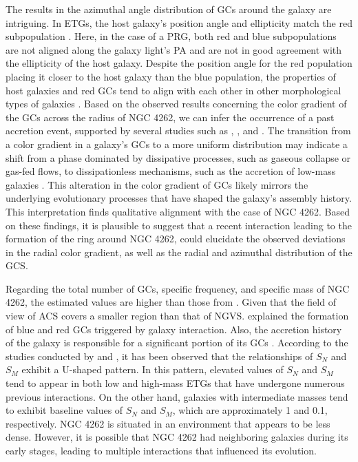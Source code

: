 \documentclass[fleqn,usenatbib]{mnras}
\begin{document}
The results in the azimuthal angle distribution of GCs around the galaxy are intriguing. In ETGs, the host galaxy's position angle and ellipticity match the red subpopulation \citep{2013Wang}. Here, in the case of a PRG, both red and blue subpopulations are not aligned along the galaxy light's PA and are not in good agreement with the ellipticity of the host galaxy. Despite the position angle for the red population placing it closer to the host galaxy than the blue population, the properties of host galaxies and red GCs tend to align with each other in other morphological types of galaxies \citep{2007Rhode,2016Kartha}. Based on the observed results concerning the color gradient of the GCs across the radius of NGC 4262, we can infer the occurrence of a past accretion event, supported by several studies such as \citet{2011forbe}, \citet{2017Caso}, and \citet{2024Caso}. The transition from a color gradient in a galaxy's GCs to a more uniform distribution may indicate a shift from a phase dominated by dissipative processes, such as gaseous collapse or gas-fed flows, to dissipationless mechanisms, such as the accretion of low-mass galaxies \citep{2011forbe,2009Naab,2010Oser,2024Caso}. This alteration in the color gradient of GCs likely mirrors the underlying evolutionary processes that have shaped the galaxy's assembly history. This interpretation finds qualitative alignment with the case of NGC 4262. Based on these findings, it is plausible to suggest that a recent interaction leading to the formation of the ring around NGC 4262, could elucidate the observed deviations in the radial color gradient, as well as the radial and azimuthal distribution of the GCS.

Regarding the total number of GCs, specific frequency, and specific mass of NGC 4262,  the estimated values are higher than those from \citet{2008peng}. Given that the field of view of ACS covers a smaller region than that of NGVS. \citet{2001vandenbergh,2002Beasley,2013Toini,2014Li_hui} explained the formation of blue and red GCs triggered by galaxy interaction. Also, the accretion history of the galaxy is responsible for a significant portion of its GCs \citep{2011forbe}. According to the studies conducted by \citet{2010Georgiev} and \citet{2013Harris}, it has been observed that the relationships of $S_{N}$ and $S_{M}$ exhibit a U-shaped pattern. In this pattern, elevated values of $S_{N}$ and $S_{M}$ tend to appear in both low and high-mass ETGs that have undergone numerous previous interactions. On the other hand, galaxies with intermediate masses tend to exhibit baseline values of $S_{N}$ and $S_{M}$, which are approximately 1 and 0.1, respectively. NGC 4262 is situated in an environment that appears to be less dense. However, it is possible that NGC 4262 had neighboring galaxies during its early stages, leading to multiple interactions that influenced its evolution.
\end{document}
